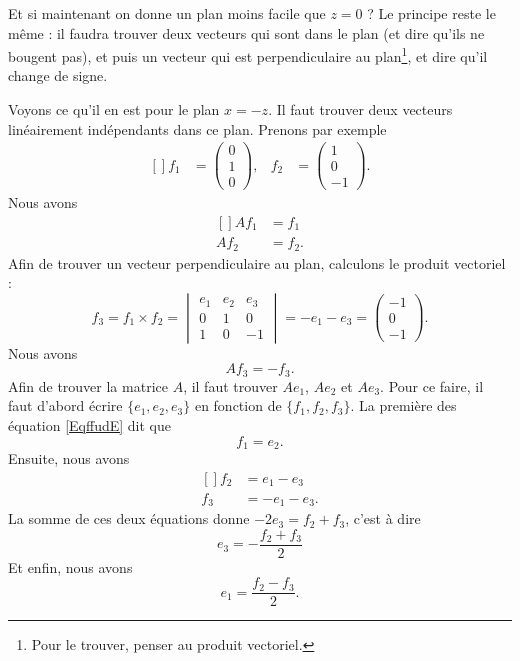 Et si maintenant on donne un plan moins facile que $z=0$ ? Le principe reste le même : il faudra trouver deux vecteurs qui sont dans le plan (et dire qu'ils ne bougent pas), et puis un vecteur qui est perpendiculaire au plan\footnote{Pour le trouver, penser au produit vectoriel.}, et dire qu'il change de signe.

Voyons ce qu'il en est pour le plan $x=-z$. Il faut trouver deux vecteurs linéairement indépendants dans ce plan. Prenons par exemple
\begin{equation}		\label{EqffudE}
	\begin{aligned}[]
		f_1&=\begin{pmatrix}
			0	\\ 
			1	\\ 
			0	
		\end{pmatrix},&f_2&=\begin{pmatrix}
			1	\\ 
			0	\\ 
			-1	
		\end{pmatrix}.
	\end{aligned}
\end{equation}
Nous avons 
\begin{equation}
	\begin{aligned}[]
		Af_1&=f_1\\
		Af_2&=f_2.
	\end{aligned}
\end{equation}
Afin de trouver un vecteur perpendiculaire au plan, calculons le produit vectoriel :
\begin{equation}
	f_3=f_1\times f_2=\begin{vmatrix}
		e_1	&	e_2	&	e_3	\\
		0	&	1	&	0	\\
		1	&	0	&	-1
	\end{vmatrix}=-e_1-e_3=\begin{pmatrix}
		-1	\\ 
		0	\\ 
		-1	
	\end{pmatrix}.
\end{equation}
Nous avons 
\begin{equation}
	Af_3=-f_3.
\end{equation}
Afin de trouver la matrice $A$, il faut trouver $Ae_1$, $Ae_2$ et $Ae_3$. Pour ce faire, il faut d'abord écrire $\{ e_1,e_2,e_3 \}$ en fonction de $\{ f_1,f_2,f_3 \}$. La première des équation \eqref{EqffudE} dit que 
\begin{equation}
	f_1=e_2.
\end{equation}
Ensuite, nous avons
\begin{equation}
	\begin{aligned}[]
		f_2&=e_1-e_3\\
		f_3&=-e_1-e_3.
	\end{aligned}
\end{equation}
La somme de ces deux équations donne $-2e_3=f_2+f_3$, c'est à dire
\begin{equation}
	e_3=-\frac{ f_2+f_3 }{ 2 }
\end{equation}
Et enfin, nous avons
\begin{equation}
	e_1=\frac{ f_2-f_3 }{ 2 }.
\end{equation}

